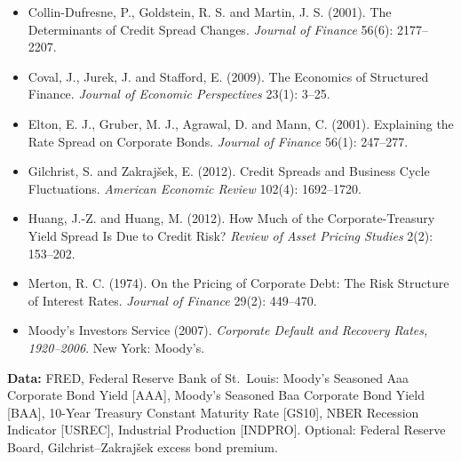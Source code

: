\begin{itemize}
  \item Collin-Dufresne, P., Goldstein, R. S. and Martin, J. S. (2001). The Determinants of Credit Spread Changes. \emph{Journal of Finance} 56(6): 2177--2207.
  \item Coval, J., Jurek, J. and Stafford, E. (2009). The Economics of Structured Finance. \emph{Journal of Economic Perspectives} 23(1): 3--25.
  \item Elton, E. J., Gruber, M. J., Agrawal, D. and Mann, C. (2001). Explaining the Rate Spread on Corporate Bonds. \emph{Journal of Finance} 56(1): 247--277.
  \item Gilchrist, S. and Zakraj\v{s}ek, E. (2012). Credit Spreads and Business Cycle Fluctuations. \emph{American Economic Review} 102(4): 1692--1720.
  \item Huang, J.-Z. and Huang, M. (2012). How Much of the Corporate-Treasury Yield Spread Is Due to Credit Risk? \emph{Review of Asset Pricing Studies} 2(2): 153--202.
  \item Merton, R. C. (1974). On the Pricing of Corporate Debt: The Risk Structure of Interest Rates. \emph{Journal of Finance} 29(2): 449--470.
  \item Moody's Investors Service (2007). \emph{Corporate Default and Recovery Rates, 1920--2006}. New York: Moody's.
\end{itemize}

\textbf{Data:} FRED, Federal Reserve Bank of St.\ Louis: Moody's Seasoned Aaa Corporate Bond Yield [AAA], Moody's Seasoned Baa Corporate Bond Yield [BAA], 10-Year Treasury Constant Maturity Rate [GS10], NBER Recession Indicator [USREC], Industrial Production [INDPRO]. Optional: Federal Reserve Board, Gilchrist--Zakraj\v{s}ek excess bond premium.
